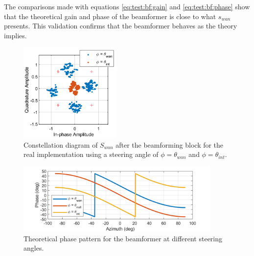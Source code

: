 \documentclass[12pt,a4paper]{report}
\begin{document}
The comparisons made with equations \ref{eq:test:bf:gain} and \ref{eq:test:bf:phase} show that the theoretical gain and phase of the beamformer is close to what $s_{wan}$ presents. This validation confirms that the beamformer behaves as the theory implies.

\begin{figure}[h]
    \centering
    \includegraphics[width = 0.45\textwidth]{Figures/attenuation.png}
    \caption[Measured constellation diagram after the RX beamforming.]{Constellation diagram of $S_{wan}$ after the beamforming block  for the real implementation using a steering angle of $\phi = \theta_{wan}$ and $\phi = \theta_{int}$.}
    \label{fig:fig:test:bf:rx:att}
\end{figure}

\begin{figure}[h]
    \centering
    \includegraphics[width = 0.9\textwidth]{Figures/test_bf_rx_phase_pattern.png}
    \caption{Theoretical phase pattern for the beamformer at different steering angles.}
    \label{fig:test:bf:rx:phase}
\end{figure}

\newpage
\end{document}
